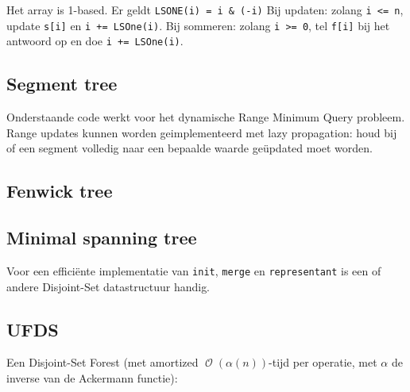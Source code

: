 \documentclass[10pt,a4paper,titlepage]{article}
\DeclareMathOperator{\bigO}{\mathcal{O}}
\begin{document}
Het array is 1-based. Er geldt \verb.LSONE(i) = i & (-i). Bij updaten: zolang \verb.i <= n., update \verb.s[i]. en \verb.i += LSOne(i).. Bij sommeren: zolang \verb.i >= 0., tel \verb.f[i]. bij het antwoord op en doe \verb.i += LSOne(i)..

\fi

\subsection{Segment tree}
Onderstaande code werkt voor het dynamische Range Minimum Query probleem. Range updates kunnen worden geimplementeerd met lazy propagation: houd bij of een segment volledig naar een bepaalde waarde ge\"updated moet worden.


\subsection{Fenwick tree}


\subsection{Minimal spanning tree}



Voor een efficiënte implementatie van \lstinline{init}, \lstinline{merge} en \lstinline{representant} is een of andere Disjoint-Set datastructuur handig. 

\subsection{UFDS}
Een Disjoint-Set Forest (met amortized $\bigO(\alpha(n))$-tijd per operatie, met $\alpha$ de inverse van de Ackermann functie):

\end{document}
